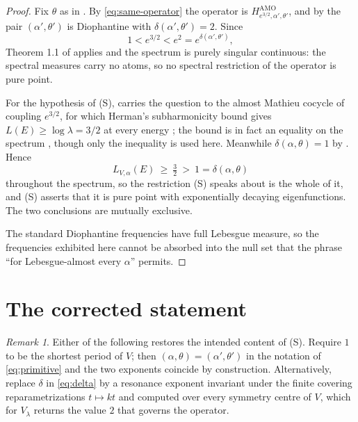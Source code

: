 \documentclass[11pt,reqno]{amsart}
\theoremstyle{plain}
\theoremstyle{definition}
\theoremstyle{remark}
\newtheorem{remark}[theorem]{Remark}
\numberwithin{equation}{section}
\begin{document}
\begin{proof}
  Fix $\theta$ as in . By \eqref{eq:same-operator} the
  operator is $H^{\mathrm{AMO}}_{e^{3/2},\alpha',\theta'}$, and by
   the pair $(\alpha',\theta')$ is Diophantine with
  $\delta(\alpha',\theta')=2$. Since
  \begin{equation}
    \label{eq:sandwich}
    1<e^{3/2}<e^{2}=e^{\delta(\alpha',\theta')},
  \end{equation}
  Theorem 1.1 of \cite{Jitomirskaya_2024ur} applies and the spectrum is
  purely singular continuous: the spectral measures carry no atoms, so no
  spectral restriction of the operator is pure point.

  For the hypothesis of (S),  carries the question to the
  almost Mathieu cocycle of coupling $e^{3/2}$, for which Herman's
  subharmonicity bound gives $L(E)\ge\log\lambda=3/2$ at every energy
  \cite{Herman_1983um,Damanik_2016so}; the bound is in fact an equality on the
  spectrum \cite{Bourgain_2002co}, though only the inequality is used here.
  Meanwhile $\delta(\alpha,\theta)=1$ by . Hence
  \begin{equation}
    \label{eq:hyp-holds}
    L_{V,\alpha}(E)\ \ge\ \tfrac32\ >\ 1=\delta(\alpha,\theta)
  \end{equation}
  throughout the spectrum, so the restriction (S) speaks about is the whole
  of it, and (S) asserts that it is pure point with exponentially decaying
  eigenfunctions. The two conclusions are mutually exclusive.

  The standard Diophantine frequencies have full Lebesgue measure, so the
  frequencies exhibited here cannot be absorbed into the null set that the
  phrase ``for Lebesgue-almost every $\alpha$'' permits.
\end{proof}

\section{The corrected statement}
\label{sec:corrected}

\begin{remark}
  \label{rem:repairs}
  Either of the following restores the intended content of (S). Require $1$
  to be the shortest period of $V$; then $(\alpha,\theta)=(\alpha',\theta')$
  in the notation of \eqref{eq:primitive} and the two exponents coincide by
  construction. Alternatively, replace $\delta$ in \eqref{eq:delta} by a
  resonance exponent invariant under the finite covering reparametrizations
  $t\mapsto kt$ and computed over every symmetry centre of $V$, which for
  $V_\lambda$ returns the value $2$ that governs the operator.
\end{remark}
\end{document}
